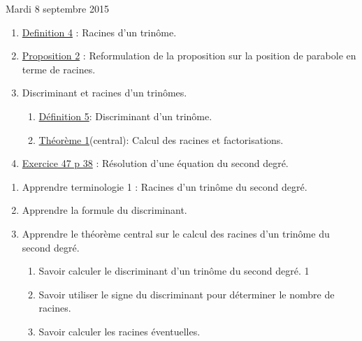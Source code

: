 \documentclass[a4paper,11pt]{article}
\theoremstyle{break}
\begin{document}
  
  Mardi 8 septembre 2015
   \begin{enumerate}   
    \item 
    \href{https://github.com/mathlorgues/math1sd1516/blob/master/20150908/definitions.pdf}
    {Definition 4} : Racines d'un trinôme.    
    \item 
    \href{https://github.com/mathlorgues/math1sd1516/blob/master/20150908/propositions.pdf}
    {Proposition 2} : Reformulation de la proposition sur la position de parabole 
    en terme de racines.
    \item Discriminant et racines d'un trinômes.
    \begin{enumerate}
      \item 
      \href{https://github.com/mathlorgues/math1sd1516/blob/master/20150908/definitions.pdf}
      {Définition 5}: Discriminant d'un trinôme.
      
      \item 
      \href{https://github.com/mathlorgues/math1sd1516/blob/master/20150908/propositions.pdf}
      {Théorème 1}(central): Calcul des racines et factorisations.
    \end{enumerate}
    \item 
    \href{https://github.com/mathlorgues/math1sd1516/blob/master/images/47-52p38.png}
    {Exercice 47 p 38} : Résolution d'une équation du second degré.
    
    
    
  \end{enumerate}
  
  \begin{Dev}
    
    \begin{enumerate}
      
      \item Apprendre terminologie 1 : Racines d'un trinôme du second degré.
      \item Apprendre la formule du discriminant.
      \item Apprendre le théorème central sur le calcul des racines 
      d'un trinôme du second degré.
      \begin{enumerate}
	\item Savoir calculer le discriminant d'un trinôme du second degré. 1
	\item Savoir utiliser le signe du discriminant pour déterminer
	le nombre de racines.
	\item Savoir calculer les racines éventuelles.
      \end{enumerate}
      
      
      
    \end{enumerate}
  \end{Dev}
  \newpage
  
\end{document}
